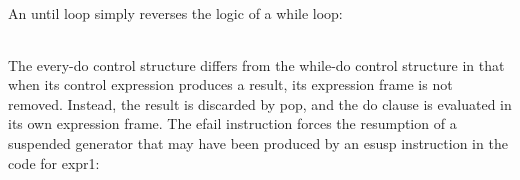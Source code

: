 An until loop simply reverses the logic of a while loop:

\begin{center}
\tablelasttail{\hline}
\begin{supertabular}{|m{1.9073598in}|m{2.75596in}|}

\end{supertabular}
\end{center}

The every-do control structure differs from the while-do control
structure in that when its control expression produces a result, its
expression frame is not removed. Instead, the result is discarded by
pop, and the do clause is evaluated in its own expression frame. The
efail instruction forces the resumption of a suspended generator that
may have been produced by an esusp instruction in the code for expr1:

\begin{center}
\tablelasttail{\hline}
\begin{supertabular}{|m{1.9073598in}|m{2.75596in}|}

\end{supertabular}
\end{center}

